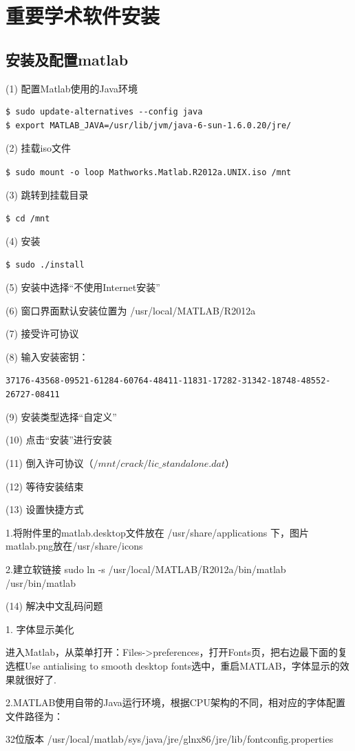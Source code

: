 \section{重要学术软件安装}
\subsection{安装及配置matlab}
(1) 配置Matlab使用的Java环境
\begin{verbatim}
$ sudo update-alternatives --config java
$ export MATLAB_JAVA=/usr/lib/jvm/java-6-sun-1.6.0.20/jre/
\end{verbatim}

(2) 挂载iso文件 

\verb"$ sudo mount -o loop Mathworks.Matlab.R2012a.UNIX.iso /mnt"

(3) 跳转到挂载目录

\verb"$ cd /mnt"

(4) 安装 

\verb"$ sudo ./install"

(5) 安装中选择“不使用Internet安装”

(6) 窗口界面默认安装位置为 /usr/local/MATLAB/R2012a

(7) 接受许可协议

(8) 输入安装密钥：

\verb"37176-43568-09521-61284-60764-48411-11831-17282-31342-18748-48552-26727-08411"

(9) 安装类型选择“自定义”

(10) 点击“安装”进行安装

(11) 倒入许可协议（$/mnt/crack/lic\_standalone.dat$）

(12) 等待安装结束

(13) 设置快捷方式

1.将附件里的matlab.desktop文件放在 /usr/share/applications 下，图片matlab.png放在/usr/share/icons

2.建立软链接 sudo ln -s /usr/local/MATLAB/R2012a/bin/matlab /usr/bin/matlab

(14) 解决中文乱码问题

1. 字体显示美化 

进入Matlab，从菜单打开：Files->preferences，打开Fonts页，把右边最下面的复选框Use antialising to smooth desktop fonts选中，重启MATLAB，字体显示的效果就很好了.

2.MATLAB使用自带的Java运行环境，根据CPU架构的不同，相对应的字体配置文件路径为：

32位版本 /usr/local/matlab/sys/java/jre/glnx86/jre/lib/fontconfig.properties

